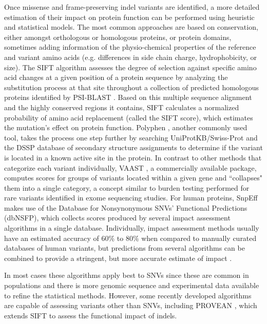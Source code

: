Once missense and frame-preserving indel variants are identified, a more detailed estimation of their impact on protein function can be performed using heuristic and statistical models. The most common approaches are based on conservation, either amongst orthologous or homologous proteins, or protein domains, sometimes adding information of the physio-chemical properties of the reference and variant amino acids (e.g. differences in side chain charge, hydrophobicity, or size). The SIFT algorithm \cite{kumar2009predicting} assesses the degree of selection against specific amino acid changes at a given position of a protein sequence by analyzing the substitution process at that site throughout a collection of predicted homologous proteins identified by PSI-BLAST \cite{altschul1997gapped}. Based on this multiple sequence alignment and the highly conserved regions it contains, SIFT calculates a normalized probability of amino acid replacement (called the SIFT score), which estimates the mutation's effect on protein function. Polyphen \cite{adzhubei2010method}, another commonly used tool, takes the process one step further by searching UniProtKB/Swiss-Prot \cite{uniprot2013update} and the DSSP database of secondary structure assignments \cite{joosten2011series} to determine if the variant is located in a known active site in the protein. In contrast to other methods that categorize each variant individually, VAAST \cite{rope2011using}, a commercially available package, computes scores for groups of variants located within a given gene and ``collapses" them into a single category, a concept similar to burden testing performed for rare variants identified in exome sequencing studies. For human proteins, SnpEff makes use of the Database for Nonsynonymous SNVs' Functional Predictions \cite{liu2011dbnsfp} (dbNSFP), which collects scores produced by several impact assessment algorithms in a single database. Individually, impact assessment methods usually have an estimated accuracy of 60\% to 80\% when compared to manually curated databases of human variants, but predictions from several algorithms can be combined to provide a stringent, but more accurate estimate of impact \cite{choi2012predicting}.

In most cases these algorithms apply best to SNVs since these are common in populations and there is more genomic sequence and experimental data available to refine the statistical methods. However, some recently developed algorithms are capable of assessing variants other than SNVs, including PROVEAN \cite{choi2012predicting}, which extends SIFT to assess the functional impact of indels.

